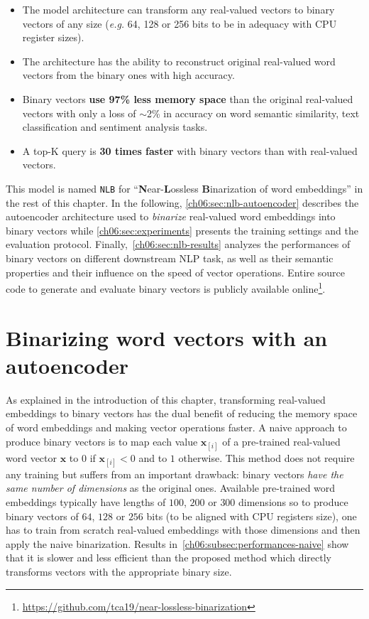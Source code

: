   \begin{itemize}
    \item The model architecture can transform any real-valued vectors to
      binary vectors of any size (\textit{e.g.} 64, 128 or 256 bits to be in
      adequacy with CPU register sizes).
    \item The architecture has the ability to reconstruct original real-valued
      word vectors from the binary ones with high accuracy.
    \item Binary vectors \textbf{use 97\% less memory space} than the original
      real-valued vectors with only a loss of $\sim$2\% in accuracy on word
      semantic similarity, text classification and sentiment analysis tasks.
    \item A top-K query is \textbf{30 times faster} with binary vectors than
      with real-valued vectors.
  \end{itemize}

  \noindent This model is named \texttt{NLB} for
  ``\textbf{N}ear-\textbf{L}ossless \textbf{B}inarization of word embeddings''
  in the rest of this chapter. In the following,
  \autoref{ch06:sec:nlb-autoencoder} describes the autoencoder architecture used
  to \textit{binarize} real-valued word embeddings into binary vectors while
  \autoref{ch06:sec:experiments} presents the training settings and the
  evaluation protocol. Finally,~\autoref{ch06:sec:nlb-results} analyzes the
  performances of binary vectors on different downstream NLP task, as well as
  their semantic properties and their influence on the speed of vector
  operations. Entire source code to generate and evaluate binary vectors is
  publicly available
  online\footnote{\url{https://github.com/tca19/near-lossless-binarization}}.

\section{Binarizing word vectors with an autoencoder}
  \label{ch06:sec:nlb-autoencoder}
  As explained in the introduction of this chapter, transforming real-valued
  embeddings to binary vectors has the dual benefit of reducing the memory space
  of word embeddings and making vector operations faster. A naive approach to
  produce binary vectors is to map each value $\mathbf{x}_{[i]}$ of a
  pre-trained real-valued word vector $\mathbf{x}$ to $0$ if $\mathbf{x}_{[i]} <
  0$ and to $1$ otherwise. This method does not require any training but suffers
  from an important drawback: binary vectors \emph{have the same number of
  dimensions} as the original ones. Available pre-trained word embeddings
  typically have lengths of $100$, $200$ or $300$ dimensions so to produce
  binary vectors of $64$, $128$ or $256$ bits (to be aligned with CPU registers
  size), one has to train from scratch real-valued embeddings with those
  dimensions and then apply the naive binarization. Results
  in~\autoref{ch06:subsec:performances-naive} show that it is slower and less
  efficient than the proposed method which directly transforms vectors with the
  appropriate binary size.

